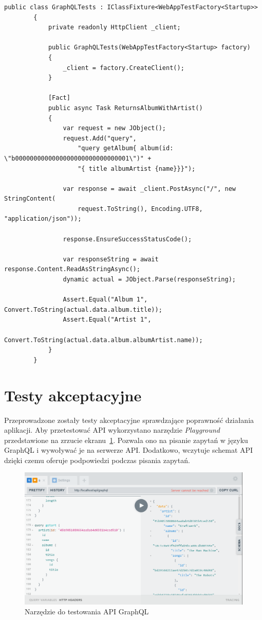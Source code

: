 	\begin{lstlisting}[label=lst:integrationTest, caption=Test integracyjny zapytania GraphQL, float]
		public class GraphQLTests : IClassFixture<WebAppTestFactory<Startup>>
		{
			private readonly HttpClient _client;

			public GraphQLTests(WebAppTestFactory<Startup> factory)
			{
				_client = factory.CreateClient();
			}

			[Fact]
			public async Task ReturnsAlbumWithArtist()
			{
				var request = new JObject();
				request.Add("query",
					"query getAlbum{ album(id: \"b0000000000000000000000000000001\")" +
					"{ title albumArtist {name}}}");

				var response = await _client.PostAsync("/", new StringContent(
					request.ToString(), Encoding.UTF8, "application/json"));

				response.EnsureSuccessStatusCode();

				var responseString = await response.Content.ReadAsStringAsync();
				dynamic actual = JObject.Parse(responseString);

				Assert.Equal("Album 1", Convert.ToString(actual.data.album.title));
				Assert.Equal("Artist 1",
					Convert.ToString(actual.data.album.albumArtist.name));
			}
		}
	\end{lstlisting}

\section{Testy akceptacyjne}
	Przeprowadzone zostały testy akceptacyjne sprawdzające poprawność działania aplikacji.
	Aby przetestować API wykorzystano narzędzie \emph{Playground} przedstawione na zrzucie ekranu~\ref{fig:playground}.
	Pozwala ono na pisanie zapytań w języku GraphQL i wywoływać je na serwerze API.
	Dodatkowo, wczytuje schemat API dzięki czemu oferuje podpowiedzi podczas pisania zapytań.
	\begin{figure}[ht]
		\centering
			\includegraphics[width=\linewidth]{rys06/playground.png}
		 \caption{Narzędzie do testowania API GraphQL}
		 \label{fig:playground}
	\end{figure}

